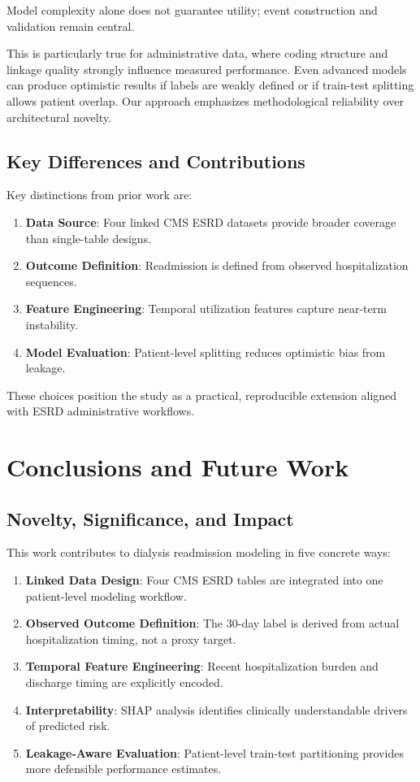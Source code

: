 \documentclass[conference]{IEEEtran}
\begin{document}
Model complexity alone does not guarantee utility; event construction and validation remain central.

This is particularly true for administrative data, where coding structure and linkage quality strongly influence measured performance. Even advanced models can produce optimistic results if labels are weakly defined or if train-test splitting allows patient overlap. Our approach emphasizes methodological reliability over architectural novelty.

\subsection{Key Differences and Contributions}
Key distinctions from prior work are:
\begin{enumerate}
    \item \textbf{Data Source}: Four linked CMS ESRD datasets provide broader coverage than single-table designs.
    \item \textbf{Outcome Definition}: Readmission is defined from observed hospitalization sequences.
    \item \textbf{Feature Engineering}: Temporal utilization features capture near-term instability.
    \item \textbf{Model Evaluation}: Patient-level splitting reduces optimistic bias from leakage.
\end{enumerate}

These choices position the study as a practical, reproducible extension aligned with ESRD administrative workflows.

\section{Conclusions and Future Work}
\subsection{Novelty, Significance, and Impact}
This work contributes to dialysis readmission modeling in five concrete ways:

\begin{enumerate}
    \item \textbf{Linked Data Design}: Four CMS ESRD tables are integrated into one patient-level modeling workflow.
    
    \item \textbf{Observed Outcome Definition}: The 30-day label is derived from actual hospitalization timing, not a proxy target.
    
    \item \textbf{Temporal Feature Engineering}: Recent hospitalization burden and discharge timing are explicitly encoded.
    
    \item \textbf{Interpretability}: SHAP analysis identifies clinically understandable drivers of predicted risk.
    
    \item \textbf{Leakage-Aware Evaluation}: Patient-level train-test partitioning provides more defensible performance estimates.
\end{enumerate}
\end{document}
